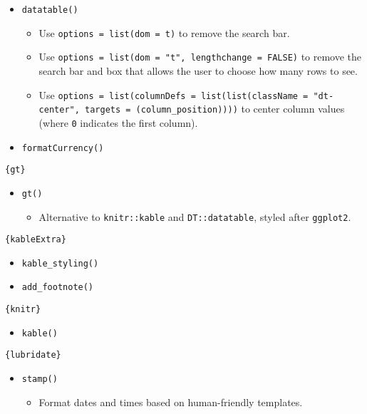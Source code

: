 \documentclass[
]{book}
\providecommand{\tightlist}{%
  \setlength{\itemsep}{0pt}\setlength{\parskip}{0pt}}
\begin{document}
\begin{itemize}
\tightlist
\item
  \texttt{datatable()}

  \begin{itemize}
  \tightlist
  \item
    Use \texttt{options\ =\ list(dom\ =\ \textquotesingle{}t\textquotesingle{})} to remove the search bar.
  \item
    Use \texttt{options\ =\ list(dom\ =\ "t",\ lengthchange\ =\ FALSE)} to remove the search bar and box that allows the user to choose how many rows to see.
  \item
    Use \texttt{options\ =\ list(columnDefs\ =\ list(list(className\ =\ "dt-center",\ targets\ =\ (column\_position))))} to center column values (where \texttt{0} indicates the first column).
  \end{itemize}
\item
  \texttt{formatCurrency()}
\end{itemize}

\texttt{\{gt\}}

\begin{itemize}
\tightlist
\item
  \texttt{gt()}

  \begin{itemize}
  \tightlist
  \item
    Alternative to \texttt{knitr::kable} and \texttt{DT::datatable}, styled after \texttt{ggplot2}.
  \end{itemize}
\end{itemize}

\texttt{\{kableExtra\}}

\begin{itemize}
\tightlist
\item
  \texttt{kable\_styling()}
\item
  \texttt{add\_footnote()}
\end{itemize}

\texttt{\{knitr\}}

\begin{itemize}
\tightlist
\item
  \texttt{kable()}
\end{itemize}

\texttt{\{lubridate\}}

\begin{itemize}
\tightlist
\item
  \texttt{stamp()}

  \begin{itemize}
  \tightlist
  \item
    Format dates and times based on human-friendly templates.
  \end{itemize}
\end{itemize}
\end{document}
